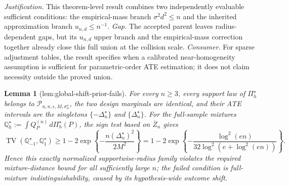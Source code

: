 \documentclass{article}
\newtheorem{lemma}{Lemma}
\begin{document}
\par\smallskip\noindent \textit{Justification.} This theorem-level result combines two independently evaluable sufficient conditions: the empirical-mass branch \(\sigma^2d^2\le n\) and the inherited approximation branch \(u_{n,d}\le n^{-1}\). \textit{Gap.} The accepted parent leaves radius-dependent gaps, but its \(u_{n,d}\) upper branch and the empirical-mass correction together already close this full union at the collision scale. \textit{Consumer.} For sparse adjustment tables, the result specifies when a calibrated near-homogeneity assumption is sufficient for parametric-order ATE estimation; it does not claim necessity outside the proved union.

\begin{lemma}[lem:global-shift-prior-fails]\label{lem:global-shift-prior-fails}
For every \(n\ge3\), every support law of \(\Pi_h^\star\) belongs to \(\mathcal P_{n,n,\epsilon,M,\sigma_n^\star}\), the two design marginals are identical, and their ATE intervals are the singletons \(\{-\Delta_n^\star\}\) and \(\{\Delta_n^\star\}\). For the full-sample mixtures \(\mathbb Q_h^\star:=\int Q_P^{(n)}\,d\Pi_h^\star(P)\), the sign test based on \(\overline Z_n\) gives \[\operatorname{TV}(\mathbb Q_{-1}^\star,\mathbb Q_1^\star)\ge1-2\exp\!\left\{-\frac{n(\Delta_n^\star)^2}{2M^2}\right\}=1-2\exp\!\left\{-\frac{\log^2(en)}{32\log^2(e+\log^2(en))}\right\}.\] Hence this exactly normalized supportwise-radius family violates the required mixture-distance bound for all sufficiently large \(n\); the failed condition is full-mixture indistinguishability, caused by its hypothesis-wide outcome shift.
\end{lemma}
\end{document}
